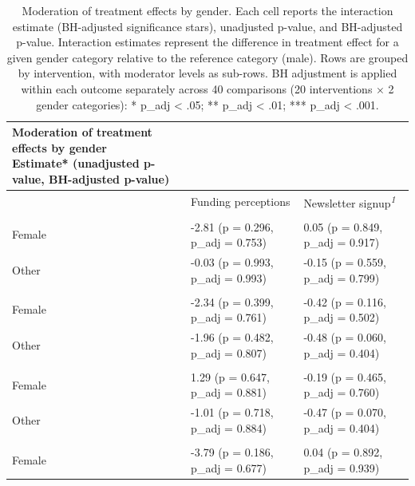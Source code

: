 \documentclass[
  letterpaper,
  DIV=11,
  numbers=noendperiod]{scrartcl}
\begin{document}
\begin{longtable}{l|ll}

\caption{\label{tbl-gender-secondary-outcomes}Moderation of treatment
effects by gender. Each cell reports the interaction estimate
(BH-adjusted significance stars), unadjusted p-value, and BH-adjusted
p-value. Interaction estimates represent the difference in treatment
effect for a given gender category relative to the reference category
(male). Rows are grouped by intervention, with moderator levels as
sub-rows. BH adjustment is applied within each outcome separately across
40 comparisons (20 interventions × 2 gender categories): * p\_adj
\textless{} .05; ** p\_adj \textless{} .01; *** p\_adj \textless{}
.001.}

\tabularnewline

\caption*{
{\large Moderation of treatment effects by gender} \\ 
{\small Estimate* (unadjusted p-value, BH-adjusted p-value)}
} \\ 
\toprule
 & Funding perceptions & Newsletter signup\textsuperscript{\textit{1}} \\ 
\midrule\addlinespace[2.5pt]
\multicolumn{3}{l}{{\bfseries intervention\_1}} \\[2.5pt] 
\midrule\addlinespace[2.5pt]
Female & {-2.81 (p = 0.296, p\_adj = 0.753)} & {0.05 (p = 0.849, p\_adj = 0.917)} \\ 
Other & {-0.03 (p = 0.993, p\_adj = 0.993)} & {-0.15 (p = 0.559, p\_adj = 0.799)} \\ 
\midrule\addlinespace[2.5pt]
\multicolumn{3}{l}{{\bfseries intervention\_10}} \\[2.5pt] 
\midrule\addlinespace[2.5pt]
Female & {-2.34 (p = 0.399, p\_adj = 0.761)} & {-0.42 (p = 0.116, p\_adj = 0.502)} \\ 
Other & {-1.96 (p = 0.482, p\_adj = 0.807)} & {-0.48 (p = 0.060, p\_adj = 0.404)} \\ 
\midrule\addlinespace[2.5pt]
\multicolumn{3}{l}{{\bfseries intervention\_11}} \\[2.5pt] 
\midrule\addlinespace[2.5pt]
Female & {1.29 (p = 0.647, p\_adj = 0.881)} & {-0.19 (p = 0.465, p\_adj = 0.760)} \\ 
Other & {-1.01 (p = 0.718, p\_adj = 0.884)} & {-0.47 (p = 0.070, p\_adj = 0.404)} \\ 
\midrule\addlinespace[2.5pt]
\multicolumn{3}{l}{{\bfseries intervention\_12}} \\[2.5pt] 
\midrule\addlinespace[2.5pt]
Female & {-3.79 (p = 0.186, p\_adj = 0.677)} & {0.04 (p = 0.892, p\_adj = 0.939)} \\ 

\end{longtable}
\end{document}
